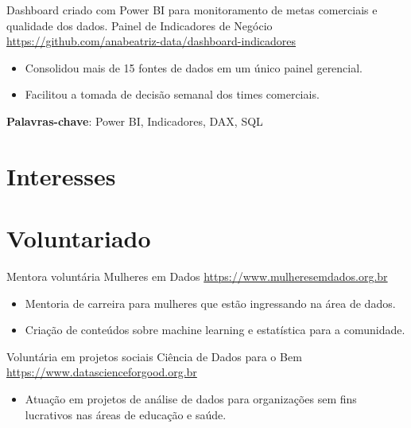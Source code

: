 \documentclass[a4paper, serif, 10pt]{moderncv}
\begin{document}
        {Dashboard criado com Power BI para monitoramento de metas comerciais e qualidade dos dados.}
        {Painel de Indicadores de Negócio}
        {\url{https://github.com/anabeatriz-data/dashboard-indicadores}}
        {}
        {\begin{itemize}
\item Consolidou mais de 15 fontes de dados em um único painel gerencial.
\item Facilitou a tomada de decisão semanal dos times comerciais.
\end{itemize}
\textbf{Palavras-chave}: Power BI, Indicadores, DAX, SQL}
\section{Interesses}

\section{Voluntariado}

        {Mentora voluntária}
        {Mulheres em Dados}
        {\url{https://www.mulheresemdados.org.br}}
        {}
        {\begin{itemize}
\item Mentoria de carreira para mulheres que estão ingressando na área de dados.
\item Criação de conteúdos sobre machine learning e estatística para a comunidade.
\end{itemize}}
    

        {Voluntária em projetos sociais}
        {Ciência de Dados para o Bem}
        {\url{https://www.datascienceforgood.org.br}}
        {}
        {\begin{itemize}
\item Atuação em projetos de análise de dados para organizações sem fins lucrativos nas áreas de educação e saúde.
\end{itemize}}
    
\end{document}
